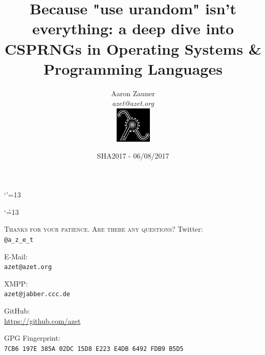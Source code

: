 \documentclass[hyperref={draft}, aspectratio=169, compress, 10pt]{beamer}
\title{Because "use urandom" isn't everything: a deep dive into CSPRNGs in Operating Systems \& Programming Languages}
\author[Aaron Zauner]{Aaron Zauner\\
        \textit{azet@azet.org}\\
        \vspace{10px}
        \includegraphics[height=65px,width=65px]{lambda}
       }
\institute{lambda.co.at:\\Highly-Available, Scalable \& Secure Distributed Systems}
\date{SHA2017 - 06/08/2017}
\begin{document}
\makeatletter
\let \@sverbatim \@verbatim
\def \@verbatim {\@sverbatim \verbatimplus}
{\catcode`'=13 \gdef \verbatimplus{\catcode`'=13 \chardef '=13 }} 
\makeatother

\makeatletter
{\catcode`\`=13
\xdef\@verbatim{\unexpanded\expandafter{\@verbatim}\chardef\noexpand`=18 }
}
\makeatother

{

\begin{frame}
  \titlepage
\end{frame}

}
\addtocounter{framenumber}{-1}

{

\begin{frame}
  \tableofcontents
\end{frame}

}
\addtocounter{framenumber}{-1}





\begin{frame}
  \begin{center}
    \textsc{Thanks for your patience. Are there any questions?}
    \vfill
    Twitter:\\
    \texttt{@a\_z\_e\_t}

    \vfill
    E-Mail:\\
    \texttt{azet@azet.org}

    \vfill
    XMPP:\\
    \texttt{azet@jabber.ccc.de}

    \vfill
    GitHub:\\
    \url{https://github.com/azet}

    \vfill
    GPG Fingerprint:\\
    \texttt{7CB6 197E 385A 02DC 15D8 E223 E4DB 6492 FDB9 B5D5}
  \end{center}
\end{frame}


\end{document}
